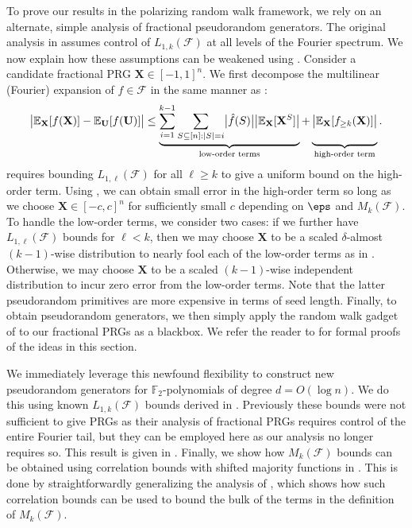 To prove our results {in the polarizing random walk framework}, we rely on an alternate, simple analysis of fractional pseudorandom generators.
%
{The original analysis in \cite{CHHL} assumes control of $L_{1,k}(\mathcal{F})$ at all levels of the Fourier spectrum.
We now explain how these assumptions can be weakened using .
Consider a candidate fractional PRG $\mathbf{X}\in [-1,1]^n$.} 
%
We first decompose the multilinear (Fourier) expansion of $f\in \mathcal{F}$
in the same manner as \cite{CHHL}:
%
\begin{equation}
   \bigl| \mathbb{E}_{\mathbf{X}}[f(\mathbf{X})]-\mathbb{E}_{\mathbf{U}}[f(\mathbf{U})] \bigr|
   \leq  \underbrace{\sum_{i=1}^{k-1}\sum_{S\subseteq [n]:\vert S\vert = i} \bigl| \hat{f}(S) \bigr|
   \bigl| \mathbb{E}_{\mathbf{X}}[\mathbf{X}^S] \bigr|}_{\text{low-order terms}} + 
   \underbrace{\vphantom{\sum_{S\subseteq[n}} \bigl| \mathbb{E}_{\mathbf{X}}[f_{\geq k}(\mathbf{X})] \bigr| }_{\text{high-order term}}.
\end{equation}
{\cite{CHHL} requires bounding $L_{1,\ell}(\mathcal{F})$ for all $\ell \ge k$ to give a uniform bound on the high-order term.  
%
Using , we can obtain small error in the high-order term so long as we choose $\mathbf{X}\in [-c,c]^n$ for sufficiently small $c$ depending on $\eps$ and $M_k(\mathcal{F})$. 
%
To handle the low-order terms, we consider two cases: if we further have $L_{1,\ell}(\mathcal{F})$ bounds for $\ell<k$, then we may choose $\mathbf{X}$ to be a scaled $\delta$-almost $(k-1)$-wise distribution to nearly fool each of the low-order terms as in \cite{CHHL}. Otherwise, we may choose $\mathbf{X}$ to be a scaled $(k-1)$-wise independent distribution to incur zero error from the low-order terms. Note that the latter pseudorandom primitives are more expensive in terms of seed length.} Finally, to obtain pseudorandom generators, we then simply apply the random walk gadget of \cite{CHHL} to our fractional PRGs as a blackbox.  We refer the reader to  for formal proofs of the ideas in this section.

{We immediately leverage this newfound flexibility to construct new pseudorandom generators for $\mathbb{F}_2$-polynomials of degree $d = O(\log n)$.
%
We do this using known $L_{1,k}(\mathcal{F})$ bounds derived in \cite{CHHL}.
Previously these bounds were not sufficient to give PRGs as their analysis of fractional PRGs requires control of the entire Fourier tail,
%
but they can be employed here as our analysis no longer requires so. This result is given in . Finally, we show how $M_k(\mathcal{F})$ bounds can be obtained using correlation bounds with shifted majority functions in . This is done by straightforwardly generalizing the analysis of \cite{xorlemma}, which shows how such correlation bounds can be used to bound the bulk of the terms in the definition of $M_k(\mathcal{F})$.}

